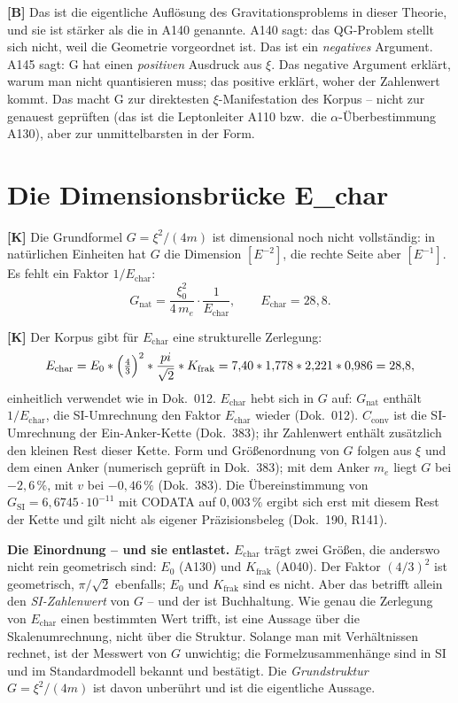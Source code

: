 \textbf{[B]} Das ist die eigentliche Auflösung des Gravitationsproblems in
dieser Theorie, und sie ist stärker als die in A140 genannte. A140 sagt: das
QG-Problem stellt sich nicht, weil die Geometrie vorgeordnet ist. Das ist ein
\emph{negatives} Argument. A145 sagt: G hat einen \emph{positiven} Ausdruck aus
$\xi$. Das negative Argument erklärt, warum man nicht quantisieren muss; das
positive erklärt, woher der Zahlenwert kommt. Das macht G zur direktesten
$\xi$-Manifestation des Korpus -- nicht zur genauest geprüften (das ist die
Leptonleiter A110 bzw.\ die $\alpha$-Überbestimmung A130), aber zur
unmittelbarsten in der Form.

\section{Die Dimensionsbrücke E\_char}

\textbf{[K]} Die Grundformel $G=\xi^2/(4m)$ ist dimensional noch nicht
vollständig: in natürlichen Einheiten hat $G$ die Dimension $[E^{-2}]$, die
rechte Seite aber $[E^{-1}]$. Es fehlt ein Faktor $1/E_\text{char}$:
\[
  G_\text{nat} = \frac{\xi_0^2}{4\,m_e}\cdot\frac{1}{E_\text{char}},
  \qquad E_\text{char} = 28{,}8 .
\]

\textbf{[K]} Der Korpus gibt für $E_\text{char}$ eine strukturelle Zerlegung:
\[
  E_\text{char} = E_0\cdot\Bigl(\tfrac43\Bigr)^2\cdot\frac{\pi}{\sqrt2}\cdot
  K_\text{frak} = 7{,}40\cdot 1{,}778\cdot 2{,}221\cdot 0{,}986 = 28{,}8 ,
\]
einheitlich verwendet wie in Dok.~012. $E_\text{char}$ hebt sich in $G$ auf: $G_\text{nat}$ enthält $1/E_\text{char}$, die SI-Umrechnung den Faktor $E_\text{char}$ wieder (Dok.~012). $C_\text{conv}$ ist die SI-Umrechnung der Ein-Anker-Kette (Dok.~383); ihr Zahlenwert enthält zusätzlich den kleinen Rest dieser Kette. Form und Größenordnung von $G$ folgen aus $\xi$ und dem einen Anker (numerisch geprüft in Dok.~383); mit dem Anker $m_e$ liegt $G$ bei $-2{,}6\,\%$, mit $v$ bei $-0{,}46\,\%$ (Dok.~383). Die Übereinstimmung von $G_\text{SI} = 6{,}6745\cdot10^{-11}$ mit CODATA auf $0{,}003\,\%$ ergibt sich erst mit diesem Rest der Kette und gilt nicht als eigener Präzisionsbeleg (Dok.~190, R141).

\textbf{Die Einordnung -- und sie entlastet.} $E_\text{char}$ trägt zwei Größen,
die anderswo nicht rein geometrisch sind: $E_0$ (A130) und $K_\text{frak}$
(A040). Der Faktor $(4/3)^2$ ist geometrisch, $\pi/\sqrt2$ ebenfalls; $E_0$ und
$K_\text{frak}$ sind es nicht. Aber das betrifft allein den \emph{SI-Zahlenwert}
von $G$ -- und der ist Buchhaltung. Wie genau die Zerlegung von $E_\text{char}$ einen bestimmten Wert
trifft, ist eine Aussage über die Skalenumrechnung, nicht über die Struktur.
Solange man mit Verhältnissen rechnet, ist der Messwert von $G$ unwichtig; die
Formelzusammenhänge sind in SI und im Standardmodell bekannt und bestätigt. Die
\emph{Grundstruktur} $G = \xi^2/(4m)$ ist davon unberührt und ist die eigentliche
Aussage.

